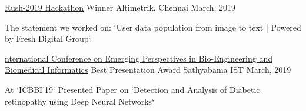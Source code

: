 

\begin{cventries}

  \cventry
    {\href{https://rush.hackerearth.com}{Rush-2019 Hackathon}} %
    {Winner} %
    {Altimetrik, Chennai} %
    {March, 2019} %
    {
      \begin{cvitems} %
        \item {The statement we worked on: `User data population from image to text | Powered by Fresh Digital Group`.}
      \end{cvitems}
    }

  \cventry
    {\href{http://icbbi2019.in}{nternational Conference on Emerging Perspectives in Bio-Engineering and Biomedical Informatics}} %
    {Best Presentation Award} %
    {Sathyabama IST} %
    {March, 2019} %
    {
      \begin{cvitems} %
        \item {At `ICBBI'19`
Presented Paper on `Detection and Analysis of Diabetic retinopathy using Deep Neural Networks` }
      \end{cvitems}
    }



\end{cventries}
